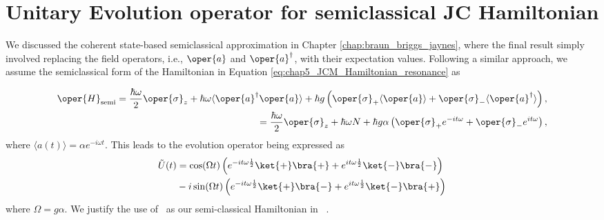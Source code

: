 \section{Unitary Evolution operator for semiclassical JC Hamiltonian}
We discussed the coherent state-based semiclassical approximation in Chapter 
\ref{chap:braun_briggs_jaynes}, where the final result simply involved replacing 
the field operators, i.e., \( \oper{a} \) and \( \oper{a}^\dagger \), with their 
expectation values. Following a similar approach, we assume the semiclassical form 
of the Hamiltonian in Equation \ref{eq:chap5_JCM_Hamiltonian_resonance} as

\begin{equation}
    \label{eq:chap5_JCM_Hamiltonian_semi}
    \begin{aligned}
        \oper{H}_{\text{semi}} = \frac{\hbar\omega}{2} \oper{\sigma}_z + \hbar \omega \langle \oper{a}^\dagger \oper{a} \rangle
    + \hbar g \left( \oper{\sigma}_+ \langle \oper{a} \rangle + \oper{\sigma}_- \langle \oper{a}^\dagger \rangle \right),\\
    = \frac{\hbar\omega}{2} \oper{\sigma}_z + \hbar \omega N 
    + \hbar g \alpha\left( \oper{\sigma}_+ e^{-it\omega} + \oper{\sigma}_- e^{it\omega} \right),
    \end{aligned}
\end{equation}
where \(\langle a(t) \rangle = \alpha e^{-i\omega t}\). This leads to the evolution operator being expressed as
\begin{align}
        \tilde{U}(t) &= 
                \cos(\Omega t) \left(e^{-i t \omega \frac{1}{2}}\ket{+}\bra{+} + 
                e^{i t \omega \frac{1}{2}}\ket{-}\bra{-} \right)  \nonumber\\
                &- i \sin(\Omega t)
                 \left( e^{-i t \omega \frac{1}{2}}\ket{+}\bra{-}
                + e^{i t \omega \frac{1}{2}}\ket{-}\bra{+}\right)
\end{align}
where \(\Omega = {g\alpha}\). We justify the 
use of~ as our semi-classical Hamiltonian in~ . 

